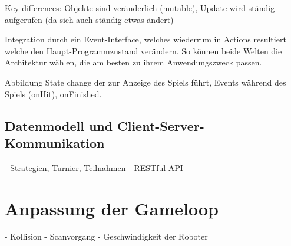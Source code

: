 Key-differences: Objekte sind veränderlich (mutable), Update wird ständig aufgerufen (da sich auch
ständig etwas ändert)

Integration durch ein Event-Interface, welches wiederrum in Actions resultiert welche den
Haupt-Programmzustand verändern. So können beide Welten die Architektur wählen, die am besten zu
ihrem Anwendungszweck passen.

Abbildung State change der zur Anzeige des Spiels führt, Events während des Spiels (onHit),
onFinished.


\subsection{Datenmodell und Client-Server-Kommunikation}

- Strategien, Turnier, Teilnahmen - RESTful API

\section{Anpassung der Gameloop}

- Kollision - Scanvorgang - Geschwindigkeit der Roboter

